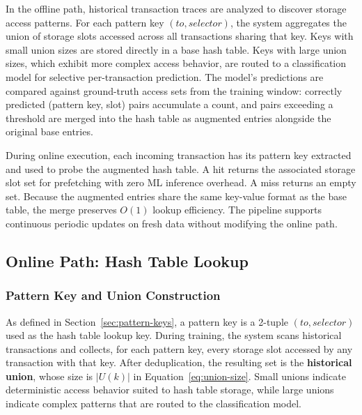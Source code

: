 \documentclass[conference]{IEEEtran}
\begin{document}
In the offline path, historical transaction traces are analyzed to discover storage access patterns. For each pattern key $(to, selector)$, the system aggregates the union of storage slots accessed across all transactions sharing that key. Keys with small union sizes are stored directly in a base hash table. Keys with large union sizes, which exhibit more complex access behavior, are routed to a classification model for selective per-transaction prediction. The model's predictions are compared against ground-truth access sets from the training window: correctly predicted (pattern key, slot) pairs accumulate a count, and pairs exceeding a threshold are merged into the hash table as augmented entries alongside the original base entries.

During online execution, each incoming transaction has its pattern key extracted and used to probe the augmented hash table. A hit returns the associated storage slot set for prefetching with zero ML inference overhead. A miss returns an empty set. Because the augmented entries share the same key-value format as the base table, the merge preserves $O(1)$ lookup efficiency. The pipeline supports continuous periodic updates on fresh data without modifying the online path.

\subsection{Online Path: Hash Table Lookup}

\subsubsection{Pattern Key and Union Construction}
\label{sec:pattern-key}

As defined in Section~\ref{sec:pattern-keys}, a pattern key is a 2-tuple $(to, selector)$ used as the hash table lookup key.
During training, the system scans historical transactions and collects, for each pattern key, every storage slot accessed by any transaction with that key.
After deduplication, the resulting set is the \textbf{historical union}, whose size is $|U(k)|$ in Equation~\ref{eq:union-size}.
Small unions indicate deterministic access behavior suited to hash table storage, while large unions indicate complex patterns that are routed to the classification model.
\end{document}
